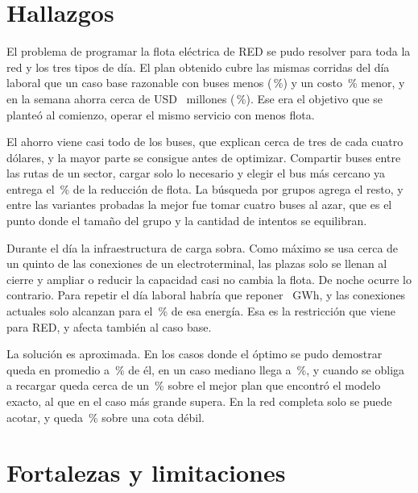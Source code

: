 
\section{Hallazgos}
\label{sec:hallazgos}

El problema de programar la flota eléctrica de RED se pudo resolver para toda la red y los tres tipos de día. El plan obtenido cubre las mismas \CorridasLaboral{} corridas del día laboral que un caso base razonable con \AhorroBusesLaboral{} buses menos (\DeltaPctBusesLaboral\,\%) y un costo \BajaCostoLaboral\,\% menor, y en la semana ahorra cerca de USD~\AhorroSemanaMillones{} millones (\DeltaPctSemana\,\%). Ese era el objetivo que se planteó al comienzo, operar el mismo servicio con menos flota.

El ahorro viene casi todo de los buses, que explican cerca de tres de cada cuatro dólares, y la mayor parte se consigue antes de optimizar. Compartir buses entre las rutas de un sector, cargar solo lo necesario y elegir el bus más cercano ya entrega el \PctAhorroInicial\,\% de la reducción de flota. La búsqueda por grupos agrega el resto, y entre las variantes probadas la mejor fue tomar cuatro buses al azar, que es el punto donde el tamaño del grupo y la cantidad de intentos se equilibran.

Durante el día la infraestructura de carga sobra. Como máximo se usa cerca de un quinto de las conexiones de un electroterminal, las plazas solo se llenan al cierre y ampliar o reducir la capacidad casi no cambia la flota. De noche ocurre lo contrario. Para repetir el día laboral habría que reponer \ReponerGwhLaboral~GWh, y las conexiones actuales solo alcanzan para el \PctCubiertoLaboral\,\% de esa energía. Esa es la restricción que viene para RED, y afecta también al caso base.

La solución es aproximada. En los casos donde el óptimo se pudo demostrar queda en promedio a \BrechaCuartetos\,\% de él, en un caso mediano llega a \BrechaCuartetosRutasOchoAbs\,\%, y cuando se obliga a recargar queda cerca de un \DifMediaRecargaCientoCincuentaAbs\,\% sobre el mejor plan que encontró el modelo exacto, al que en el caso más grande supera. En la red completa solo se puede acotar, y queda \BrechaCotaCosto\,\% sobre una cota débil.

\section{Fortalezas y limitaciones}
\label{sec:fortalezas}

